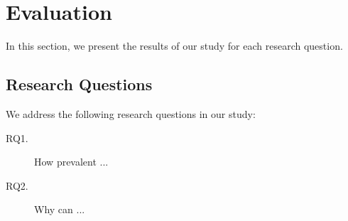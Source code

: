 
\section{Evaluation}\label{Sec:evaluationSection}

In this section, we present the results of our study for each research question.

\subsection{Research Questions}
We address the following research questions in our study:

\begin{description}

\item [RQ1.]  
How prevalent ...

\item [RQ2.]
Why can ...


\end{description}



